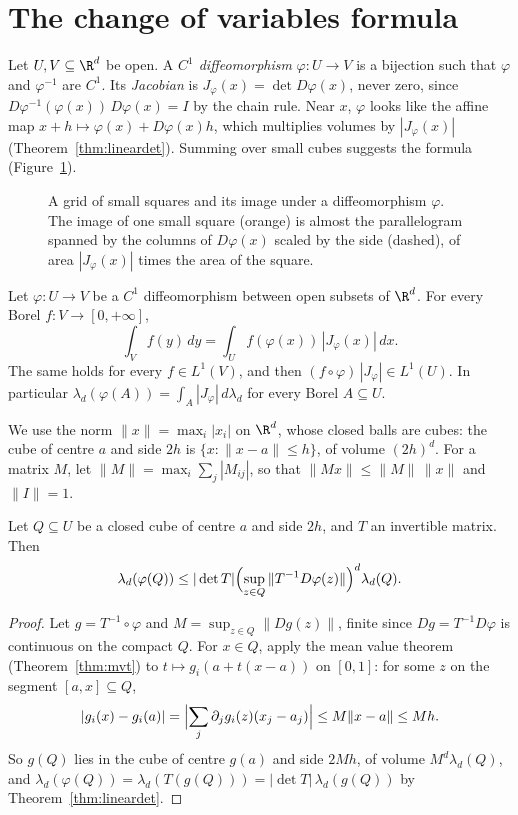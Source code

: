 \section{The change of variables formula}

Let $U,V\subseteq\R^d$ be open. A \emph{$C^1$ diffeomorphism} $\varphi:U\to V$ is a bijection such that $\varphi$ and $\varphi^{-1}$ are $C^1$. Its \emph{Jacobian} is $J_\varphi(x)=\det D\varphi(x)$, never zero, since
$D\varphi^{-1}(\varphi(x))\,D\varphi(x)=I$ by the chain rule. Near $x$, $\varphi$ looks like the affine map $x+h\mapsto\varphi(x)+D\varphi(x)h$, which multiplies volumes by $|J_\varphi(x)|$
(Theorem~\ref{thm:lineardet}). Summing over small cubes suggests the formula (Figure~\ref{fig:diffeo}).

\begin{figure}[ht]
\centering
{}
\caption{A grid of small squares and its image under a diffeomorphism $\varphi$. The image of one small square (orange) is almost the parallelogram spanned by the columns of
$D\varphi(x)$ scaled by the side (dashed), of area $|J_\varphi(x)|$ times the area of the square.}
\label{fig:diffeo}
\end{figure}

\begin{theorem}\label{thm:cov}
Let $\varphi:U\to V$ be a $C^1$ diffeomorphism between open subsets of $\R^d$. For every Borel $f:V\to[0,+\infty]$,
\[\int_Vf(y)\,dy=\int_Uf(\varphi(x))\,|J_\varphi(x)|\,dx.\]
The same holds for every $f\in L^1(V)$, and then $(f\circ\varphi)\,|J_\varphi|\in L^1(U)$. In particular $\lambda_d(\varphi(A))=\int_A|J_\varphi|\,d\lambda_d$ for every Borel $A\subseteq U$.
\end{theorem}

We use the norm $\|x\|=\max_i|x_i|$ on $\R^d$, whose closed balls are cubes: the cube of centre $a$ and side $2h$ is $\{x:\|x-a\|\le h\}$, of volume $(2h)^d$. For a matrix $M$, let
$\|M\|=\max_i\sum_j|M_{ij}|$, so that $\|Mx\|\le\|M\|\,\|x\|$ and $\|I\|=1$.

\begin{lemma}\label{lem:cube}
Let $Q\subseteq U$ be a closed cube of centre $a$ and side $2h$, and $T$ an invertible matrix. Then
\[\lambda_d(\varphi(Q))\le|\det T|\Bigl(\sup_{z\in Q}\|T^{-1}D\varphi(z)\|\Bigr)^d\lambda_d(Q).\]
\end{lemma}
\begin{proof}
Let $g=T^{-1}\circ\varphi$ and $M=\sup_{z\in Q}\|Dg(z)\|$, finite since $Dg=T^{-1}D\varphi$ is continuous on the compact $Q$. For $x\in Q$, apply the mean value theorem (Theorem~\ref{thm:mvt}) to
$t\mapsto g_i(a+t(x-a))$ on $[0,1]$: for some $z$ on the segment $[a,x]\subseteq Q$,
\[|g_i(x)-g_i(a)|=\Bigl|\sum_j\partial_jg_i(z)(x_j-a_j)\Bigr|\le M\|x-a\|\le Mh.\]
So $g(Q)$ lies in the cube of centre $g(a)$ and side $2Mh$, of volume $M^d\lambda_d(Q)$, and $\lambda_d(\varphi(Q))=\lambda_d(T(g(Q)))=|\det T|\,\lambda_d(g(Q))$ by Theorem~\ref{thm:lineardet}.
\end{proof}

